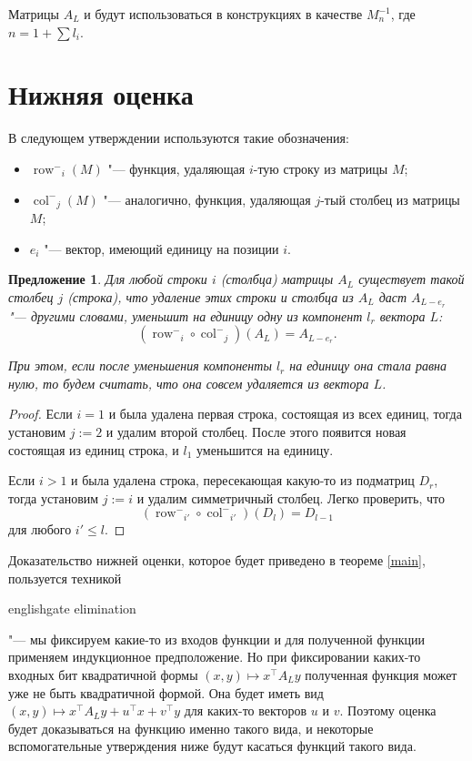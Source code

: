 \documentclass[oneside, a4paper]{article}
\newtheorem{proposition}{Предложение}
\theoremstyle{definition}
\theoremstyle{remark}
\newcommand\rowm{\ensuremath{\operatorname{row}^-}}
\newcommand\colm{\ensuremath{\operatorname{col}^-}}
\begin{document}
Матрицы $A_L$ и будут использоваться в конструкциях в качестве $M_n^{-1}$, где
$n = 1 + \sum l_i$.

\section{Нижняя оценка}

В следующем утверждении используются такие обозначения:
\begin{itemize}
\item $\rowm_i(M)$ "--- функция, удаляющая $i$-тую строку из матрицы $M$;
\item $\colm_j(M)$ "--- аналогично, функция, удаляющая $j$-тый столбец из матрицы $M$;
\item $e_i$ "--- вектор, имеющий единицу на позиции $i$.
\end{itemize}

\begin{proposition} \label{easy}
Для любой строки $i$ (столбца) матрицы $A_L$ существует такой столбец $j$
(строка), что удаление этих строки и столбца из $A_L$ даст $A_{L - e_r}$ "---
другими словами, уменьшит на единицу одну из компонент $l_r$ вектора $L$:
\[
(\rowm_i \circ \colm_j)(A_L) = A_{L - e_r}.
\]

При этом, если после уменьшения компоненты $l_r$ на единицу она стала равна нулю,
то будем считать, что она совсем удаляется из вектора $L$.
\end{proposition}
\begin{proof}
Если $i = 1$ и была удалена первая строка, состоящая из всех единиц, тогда
установим $j := 2$ и удалим второй столбец. После этого появится новая состоящая
из единиц строка, и $l_1$ уменьшится на единицу.

Если $i > 1$ и была удалена строка, пересекающая какую-то из подматриц $D_r$,
тогда установим $j := i$ и удалим симметричный столбец. Легко проверить, что
\[
(\rowm_{i'} \circ \colm_{i'})(D_l) = D_{l-1}
\]
для любого $i' \leq l$.
\end{proof}

Доказательство нижней оценки, которое будет приведено в теореме
\ref{main}, пользуется техникой \begin{foreignlanguage}{english}gate
elimination\end{foreignlanguage} "--- мы фиксируем какие-то из входов функции
и для полученной функции применяем индукционное предположение. Но при
фиксировании каких-то входных бит квадратичной формы $(x, y) \mapsto x^\top A_L
y$ полученная функция может уже не быть квадратичной формой. Она будет иметь
вид $(x, y) \mapsto x^\top A_L y + u^\top x + v^\top y$ для каких-то векторов
$u$ и $v$. Поэтому оценка будет доказываться на функцию именно такого вида, и
некоторые вспомогательные утверждения ниже будут касаться функций такого вида.
\end{document}
